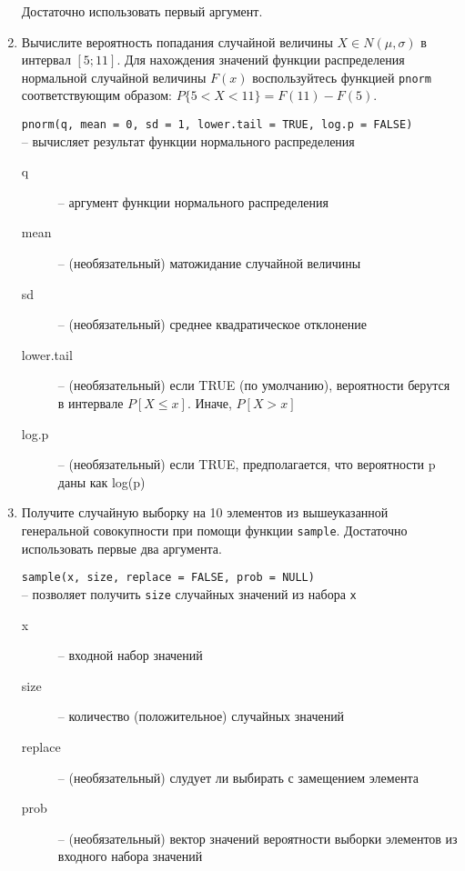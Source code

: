\begin{enumerate}
          Достаточно использовать первый аргумент.

    \item Вычислите вероятность попадания случайной величины $X \in N(\mu, \sigma)$ в интервал $[5;11]$. Для нахождения значений функции распределения
          нормальной случайной величины $F(x)$ воспользуйтесь функцией \texttt{pnorm} соответствующим образом: $P\{5<X<11\}=F(11)-F(5)$.

          \begin{mdframed}[style=BadassFrame]

              \texttt{pnorm(q, mean = 0, sd = 1, lower.tail = TRUE, log.p = FALSE)} \\
                -- вычисляет результат функции нормального распределения
              \begin{description}

                \item[q] -- аргумент функции нормального распределения
                \item[mean] -- (необязательный) матожидание случайной величины
                \item[sd] -- (необязательный) среднее квадратическое отклонение
                \item[lower.tail] -- (необязательный) если TRUE (по умолчанию), вероятности берутся в интервале $P[X \leq x]$. Иначе, $P[X > x]$ 
                \item[log.p] -- (необязательный) если TRUE, предполагается, что вероятности p даны как log(p)
              \end{description}
          \end{mdframed}

    \item Получите случайную выборку на 10 элементов из вышеуказанной генеральной совокупности при помощи функции
          \texttt{sample}. Достаточно использовать первые два аргумента.

          \begin{mdframed}[style=BadassFrame]

              \texttt{sample(x, size, replace = FALSE, prob = NULL)} \\
                -- позволяет получить \texttt{size} случайных значений из набора \texttt{x}
              \begin{description}

                \item[x] -- входной набор значений
                \item[size] -- количество (положительное) случайных значений
                \item[replace] -- (необязательный) слудует ли выбирать с замещением элемента
                \item[prob] -- (необязательный) вектор значений вероятности выборки элементов из входного набора значений
              \end{description}
          \end{mdframed}


\end{enumerate}
